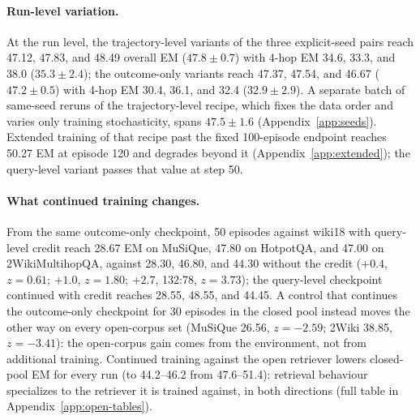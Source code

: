 \paragraph{Run-level variation.}
At the run level, the trajectory-level variants of the three explicit-seed
pairs reach 47.12, 47.83, and 48.49 overall EM ($47.8 \pm 0.7$) with
4-hop EM 34.6, 33.3, and 38.0 ($35.3 \pm 2.4$); the outcome-only variants
reach 47.37, 47.54, and 46.67 ($47.2 \pm 0.5$) with 4-hop EM 30.4, 36.1,
and 32.4 ($32.9 \pm 2.9$). A separate batch of same-seed reruns of the
trajectory-level recipe, which fixes the data order and varies only
training stochasticity, spans $47.5 \pm 1.6$ (Appendix~\ref{app:seeds}). Extended
training of that recipe past the fixed 100-episode endpoint reaches
50.27 EM at episode 120 and degrades beyond it (Appendix~\ref{app:extended}); the
query-level variant passes that value at step 50.

\paragraph{What continued training changes.}
From the same outcome-only checkpoint, 50 episodes against wiki18 with
query-level credit reach 28.67 EM on MuSiQue, 47.80 on HotpotQA, and
47.00 on 2WikiMultihopQA, against 28.30, 46.80, and 44.30 without the
credit ($+0.4$, $z=0.61$; $+1.0$, $z=1.80$; $+2.7$, 132:78, $z=3.73$);
the query-level checkpoint continued with credit reaches 28.55, 48.55,
and 44.45. A control that continues the outcome-only checkpoint for 30
episodes in the closed pool instead moves the other way on every
open-corpus set (MuSiQue 26.56, $z=-2.59$; 2Wiki 38.85, $z=-3.41$): the
open-corpus gain comes from the environment, not from additional
training. Continued training against the open retriever lowers
closed-pool EM for every run (to 44.2--46.2 from 47.6--51.4): retrieval
behaviour specializes to the retriever it is trained against, in both
directions (full table in Appendix~\ref{app:open-tables}).
